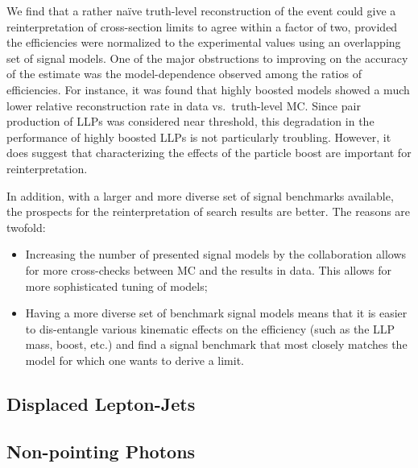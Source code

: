 \vskip 0.1in
\vskip 0.1in

We find that a rather na\"ive truth-level reconstruction of the event could give a reinterpretation of cross-section limits to agree within a factor of two, provided the efficiencies were normalized to the experimental values using an overlapping set of signal models. One of the major obstructions to improving on the accuracy of the estimate was the model-dependence observed among the ratios of efficiencies. For instance, it was found that highly boosted models showed a much lower relative reconstruction rate in data vs.~truth-level MC. Since pair production of LLPs was considered near threshold, this degradation in the performance of highly boosted LLPs is not particularly troubling. However, it does suggest that characterizing the effects of the particle boost are important for reinterpretation.

In addition, with a larger and more diverse set of signal benchmarks available, the prospects for the reinterpretation of search results are better. The reasons are twofold:~
%
\begin{itemize}
\item Increasing the number of presented signal models by the collaboration allows for more cross-checks between MC and the results in data. This allows for more sophisticated tuning of models;
\item Having a more diverse set of benchmark signal models means that it is easier to dis-entangle various kinematic effects on the efficiency (such as the LLP mass, boost, etc.) and find a signal benchmark that most closely matches the model for which one wants to derive a limit.
\end{itemize}
%

\subsection{Displaced Lepton-Jets}



\subsection{Non-pointing Photons}

